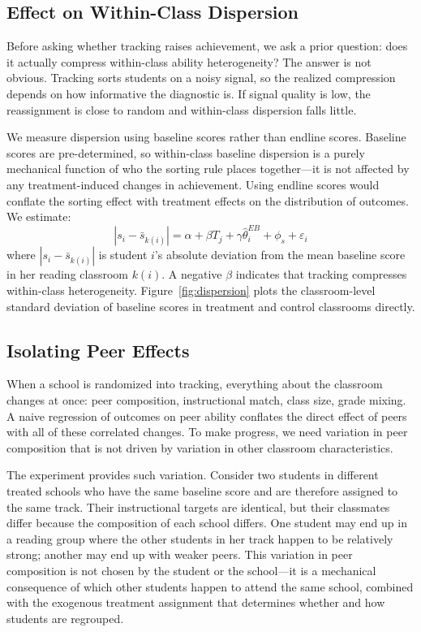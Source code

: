 \documentclass[11pt]{article}
\begin{document}
\subsection{Effect on Within-Class Dispersion}

Before asking whether tracking raises achievement, we ask a prior question: does it actually compress within-class ability heterogeneity? The answer is not obvious. Tracking sorts students on a noisy signal, so the realized compression depends on how informative the diagnostic is. If signal quality is low, the reassignment is close to random and within-class dispersion falls little.

We measure dispersion using baseline scores rather than endline scores. Baseline scores are pre-determined, so within-class baseline dispersion is a purely mechanical function of who the sorting rule places together---it is not affected by any treatment-induced changes in achievement. Using endline scores would conflate the sorting effect with treatment effects on the distribution of outcomes. We estimate:
\begin{equation}
|s_i - \bar{s}_{k(i)}| = \alpha + \beta T_j + \gamma \hat{\theta}^{EB}_i + \phi_s + \varepsilon_i
\end{equation}
where $|s_i - \bar{s}_{k(i)}|$ is student $i$'s absolute deviation from the mean baseline score in her reading classroom $k(i)$. A negative $\beta$ indicates that tracking compresses within-class heterogeneity. Figure~\ref{fig:dispersion} plots the classroom-level standard deviation of baseline scores in treatment and control classrooms directly.

\subsection{Isolating Peer Effects}
\label{sec:bh}

When a school is randomized into tracking, everything about the classroom changes at once: peer composition, instructional match, class size, grade mixing. A naive regression of outcomes on peer ability conflates the direct effect of peers with all of these correlated changes. To make progress, we need variation in peer composition that is not driven by variation in other classroom characteristics.

The experiment provides such variation. Consider two students in different treated schools who have the same baseline score and are therefore assigned to the same track. Their instructional targets are identical, but their classmates differ because the composition of each school differs. One student may end up in a reading group where the other students in her track happen to be relatively strong; another may end up with weaker peers. This variation in peer composition is not chosen by the student or the school---it is a mechanical consequence of which other students happen to attend the same school, combined with the exogenous treatment assignment that determines whether and how students are regrouped.
\end{document}
